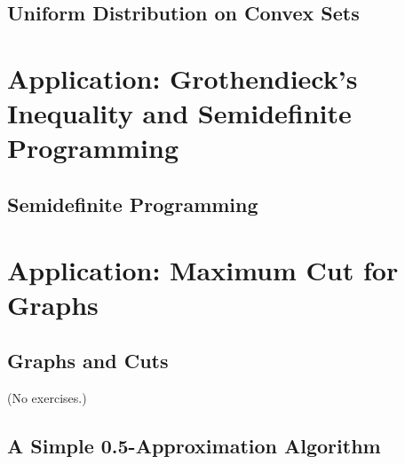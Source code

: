 \documentclass{report}
\theoremstyle{definition}
\newenvironment{exercise}[1]{
  \renewcommand\theexerciseimpl{#1}
  \exerciseimpl
}{\endexerciseimpl}
\begin{document}
\begin{exercise}{3.4.7}
\end{exercise}

\subsection{Uniform Distribution on Convex Sets}

\begin{exercise}{3.4.9}
\end{exercise}

\begin{exercise}{3.4.10}
\end{exercise}

\section{Application: Grothendieck's Inequality and Semidefinite Programming}

\begin{exercise}{3.5.2}
\end{exercise}

\begin{exercise}{3.5.3}
\end{exercise}

\subsection{Semidefinite Programming}

\begin{exercise}{3.5.5}
\end{exercise}

\begin{exercise}{3.5.7}
\end{exercise}

\section{Application: Maximum Cut for Graphs}

\subsection{Graphs and Cuts}

(No exercises.)

\subsection{A Simple 0.5-Approximation Algorithm}
\end{document}
